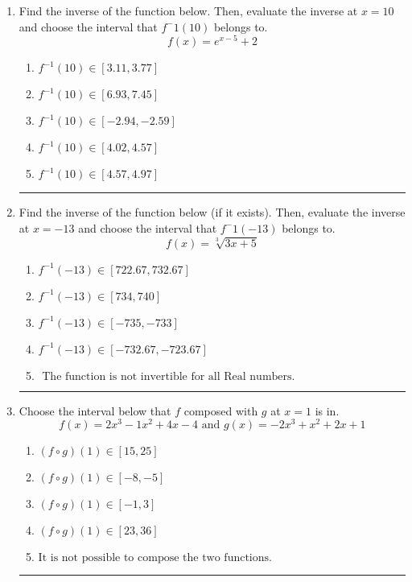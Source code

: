 \documentclass[14pt]{extbook}
\newcommand{\litem}[1]{\item#1\hspace*{-1cm}\rule{\textwidth}{0.4pt}}
\begin{document}
\begin{enumerate}
{\begin{enumerate}[label=\Alph*.]
\end{enumerate} }
\litem{
Find the inverse of the function below. Then, evaluate the inverse at $x = 10$ and choose the interval that $f^-1(10)$ belongs to.\[ f(x) = e^{x-5}+2 \]\begin{enumerate}[label=\Alph*.]
\item \( f^{-1}(10) \in [3.11, 3.77] \)
\item \( f^{-1}(10) \in [6.93, 7.45] \)
\item \( f^{-1}(10) \in [-2.94, -2.59] \)
\item \( f^{-1}(10) \in [4.02, 4.57] \)
\item \( f^{-1}(10) \in [4.57, 4.97] \)

\end{enumerate} }
\litem{
Find the inverse of the function below (if it exists). Then, evaluate the inverse at $x = -13$ and choose the interval that $f^-1(-13)$ belongs to.\[ f(x) = \sqrt[3]{3 x + 5} \]\begin{enumerate}[label=\Alph*.]
\item \( f^{-1}(-13) \in [722.67, 732.67] \)
\item \( f^{-1}(-13) \in [734, 740] \)
\item \( f^{-1}(-13) \in [-735, -733] \)
\item \( f^{-1}(-13) \in [-732.67, -723.67] \)
\item \( \text{ The function is not invertible for all Real numbers. } \)

\end{enumerate} }
\litem{
Choose the interval below that $f$ composed with $g$ at $x=1$ is in.\[ f(x) = 2x^{3} -1 x^{2} +4 x -4 \text{ and } g(x) = -2x^{3} + x^{2} +2 x + 1 \]\begin{enumerate}[label=\Alph*.]
\item \( (f \circ g)(1) \in [15, 25] \)
\item \( (f \circ g)(1) \in [-8, -5] \)
\item \( (f \circ g)(1) \in [-1, 3] \)
\item \( (f \circ g)(1) \in [23, 36] \)
\item \( \text{It is not possible to compose the two functions.} \)


\end{enumerate}}
\end{enumerate}
\end{document}

